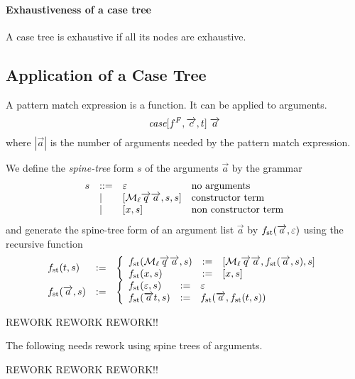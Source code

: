\paragraph{Exhaustiveness of a case tree}
%
A case tree is exhaustive if all its nodes are exhaustive.






\subsection{Application of a Case Tree}

A pattern match expression is a function. It can be applied to arguments.
$$
    {\text{\it case}} [f^F, {\overrightarrow {c}}, t]\; {\overrightarrow {a}}
$$
%
where $|\vec a|$ is the number of arguments needed by the pattern match
expression.

We define the \emph{spine-tree} form $s$ of the arguments $\vec a$ by the
grammar
$$
    \begin{array}{lllll} 
        s & ::= &
        \varepsilon & \text{no arguments}
        \\
        & \mid &
        [{\cal M}_\ell {\overrightarrow {q}} {\overrightarrow {a}}, s, s] & \text{constructor term}
        \\
        & \mid &
        [x, s] & \text{non constructor term}
     \end{array}
$$
%
and generate the spine-tree form of an argument list $\vec a$ by
${f_\text{st}}({\overrightarrow {a}}, \varepsilon)$ using the recursive
function
$$
    \begin{array}{lllll} 
        {f_\text{st}}(t,s) & := &
        \left\{ \begin{array}{lllll} 
            {f_\text{st}}({\cal M}_\ell {\overrightarrow {q}} {\overrightarrow {a}}, s) & := &
            [{\cal M}_\ell {\overrightarrow {q}} {\overrightarrow {a}}, {f_\text{st}}({\overrightarrow {a}}, s), s]
            \\
            {f_\text{st}}(x, s) & := & [x, s]
         \end{array} \right.
        \\
        {f_\text{st}}({\overrightarrow {a}}, s) & := &
        \left\{ \begin{array}{lllll} 
            {f_\text{st}}(\varepsilon, s) & := & \varepsilon
            \\
            {f_\text{st}}({\overrightarrow {a}} t, s) & := &
            {f_\text{st}}({\overrightarrow {a}}, {f_\text{st}}(t, s))
         \end{array} \right.
     \end{array}
$$

REWORK REWORK REWORK!!

The following needs rework using spine trees of arguments.

REWORK REWORK REWORK!!


